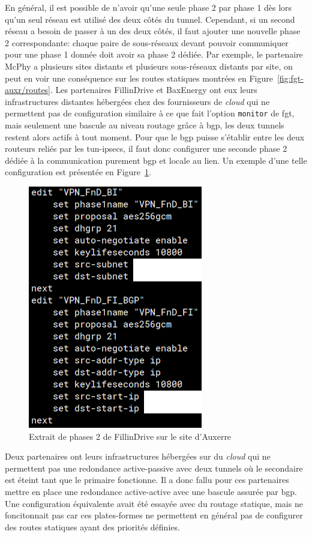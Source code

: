 \documentclass[12pt, oneside, a4paper, titlepage]{report}
\begin{document}
En général, il est possible de n'avoir qu'une seule phase 2 par phase 1 dès lors
qu'un seul réseau est utilisé des deux côtés du tunnel. Cependant, si un second
réseau a besoin de passer à un des deux côtés, il faut ajouter une nouvelle
phase 2 correspondante: chaque paire de sous-réseaux devant pouvoir communiquer
pour une phase 1 donnée doit avoir sa phase 2 dédiée. Par exemple, le partenaire
McPhy a plusieurs sites distants et plusieurs sous-réseaux distants par site, on
peut en voir une conséquence sur les routes statiques montrées en
Figure~\ref{fig:fgt-auxr/routes}. Les partenaires FillinDrive et BaxEnergy ont
eux leurs infrastructures distantes hébergées chez des fournisseurs de
\textit{cloud} qui ne permettent pas de configuration similaire à ce que fait
l'option \texttt{monitor} de \acrlong{fgt}, mais seulement une bascule au niveau
routage grâce à \gls{bgp}, les deux tunnels restent alors actifs à tout moment.
Pour que le \gls{bgp} puisse s'établir entre les deux routeurs reliés par les
\glspl{tun-ipsec}, il faut donc configurer une seconde phase 2 dédiée à la
communication purement \gls{bgp} et locale au lien. Un exemple d'une telle
configuration est présentée en Figure~\ref{fig:fgt-auxr/ipsec-phase2}.

\begin{figure}[h!]
    \centering
    \includegraphics[width = 0.5\linewidth]{img/fgt-auxr/ipsec-phase2.png}
    \caption{Extrait de phases 2 de FillinDrive sur le site d'Auxerre}%
    \label{fig:fgt-auxr/ipsec-phase2}
\end{figure}
\FloatBarrier{}

Deux partenaires ont leurs infrastructures hébergées sur du \textit{cloud} qui
ne permettent pas une redondance active-passive avec deux tunnels où le
secondaire est éteint tant que le primaire fonctionne. Il a donc fallu pour ces
partenaires mettre en place une redondance active-active avec une bascule
assurée par \gls{bgp}. Une configuration équivalente avait été essayée avec du
routage statique, mais ne foncitonnait pas car ces plates-formes ne permettent
en général pas de configurer des routes statiques ayant des priorités définies.
\end{document}
